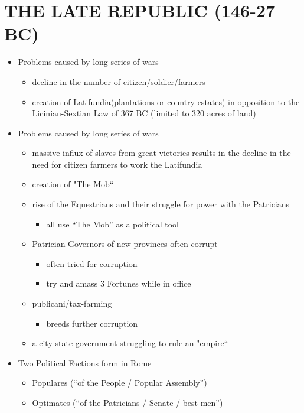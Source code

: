 \documentclass[12pt, twoside]{article}
\begin{document}
\section{THE LATE REPUBLIC (146-27 BC)}
\begin{itemize}
\item Problems caused by long series of wars
	\begin{itemize}
	\item decline in the number of citizen/soldier/farmers
	\item creation of Latifundia(plantations or country estates) in opposition to the Licinian-Sextian Law of 367 BC (limited to 320 acres of land)
	\end{itemize}
\item Problems caused by long series of wars
	\begin{itemize}
	\item massive influx of slaves from great victories results in the decline in the need for citizen farmers to work the Latifundia
	\item creation of "The Mob“
	\item rise of the Equestrians and their struggle for power with the Patricians
		\begin{itemize}
		\item all use “The Mob” as a political tool
		\end{itemize}
	\item Patrician Governors of new provinces often corrupt
		\begin{itemize}
		\item often tried for corruption
		\item try and amass 3 Fortunes while in office
		\end{itemize}
	\item publicani/tax-farming
		\begin{itemize}
		\item breeds further corruption
		\end{itemize}
	\item a city-state government struggling to rule an "empire“
	\end{itemize}
\item Two Political Factions form in Rome
	\begin{itemize}
	\item Populares (“of the People / Popular Assembly”)
	\item Optimates (“of the Patricians / Senate / best men”)
	\end{itemize}
\end{itemize}
\end{document}
